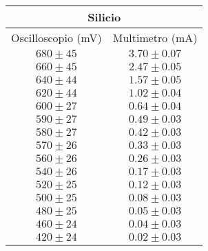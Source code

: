 \documentclass[@MAIN@]{subfiles}
\begin{document}
    \begin{tabular}{ ||c|c|| }
        \hline
        \multicolumn{2}{||c||}{Silicio} \\
        \hline
        Oscilloscopio (mV) & Multimetro (mA) \\
        \hline
        $680\pm 45$        & $3.70\pm0.07$   \\
        \hline
        $660\pm 45$        & $2.47\pm0.05$   \\
        \hline
        $640\pm 44$        & $1.57\pm0.05$   \\
        \hline
        $620\pm 44$        & $1.02\pm0.04$   \\
        \hline
        $600\pm 27$        & $0.64\pm0.04$   \\
        \hline
        $590\pm 27$        & $0.49\pm0.03$   \\
        \hline
        $580\pm 27$        & $0.42\pm0.03$   \\
        \hline
        $570\pm 26$        & $0.33\pm0.03$   \\
        \hline
        $560\pm 26$        & $0.26\pm0.03$   \\
        \hline
        $540\pm 26$        & $0.17\pm0.03$   \\
        \hline
        $520\pm 25$        & $0.12\pm0.03$   \\
        \hline
        $500\pm 25$        & $0.08\pm0.03$   \\
        \hline
        $480\pm 25$        & $0.05\pm0.03$   \\
        \hline
        $460\pm 24$        & $0.04\pm0.03$   \\
        \hline
        $420\pm 24$        & $0.02\pm0.03$   \\
        \hline

    \end{tabular}
\end{document}
